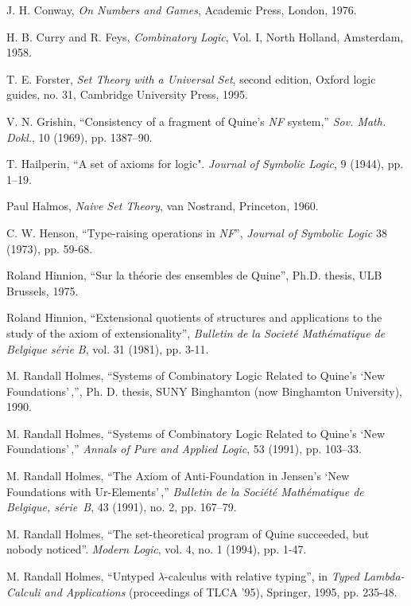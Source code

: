 \begin{thebibliography}{99}

  J. H. Conway, {\em On Numbers and Games\/}, Academic
Press, London, 1976.

  H. B. Curry and R. Feys, {\em Combinatory Logic}, Vol.
I, North Holland, Amsterdam, 1958.

T. E. Forster, {\em Set Theory with a Universal
Set\/}, second edition, Oxford logic guides, no. 31, Cambridge
University Press, 1995.

  V. N. Grishin, ``Consistency of a fragment of
Quine's {\em NF} system,'' {\em Sov. Math. Dokl.}, 10 (1969), pp. 1387--90.

 T. Hailperin, ``A set of axioms for logic".  {\em
Journal of Symbolic Logic\/}, 9 (1944), pp. 1--19.

 Paul Halmos, {\em Naive Set Theory\/}, van Nostrand,
Princeton, 1960.

 C. W. Henson,
``Type-raising operations in {\em NF\/}'',
{\em Journal of Symbolic Logic\/} 38 (1973), pp. 59-68.

  Roland Hinnion,
``Sur la th\'eorie des ensembles de Quine'',
Ph.D. thesis, ULB Brussels, 1975.

  Roland Hinnion, ``Extensional quotients of structures and applications to the study of the axiom of extensionality'', {\em Bulletin de la Societ\'e Math\'ematique de Belgique s\'erie B\/}, vol. 31 (1981), pp. 3-11.

 M. Randall Holmes, ``Systems of Combinatory Logic
Related to Quine's `New Foundations'\,,'', Ph. D. thesis, SUNY
Binghamton (now Binghamton University), 1990.

  M. Randall Holmes, ``Systems of Combinatory Logic Related to
Quine's `New Foundations'\,,'' {\em Annals of Pure and Applied Logic},
53 (1991), pp. 103--33.

 M. Randall Holmes, ``The Axiom of Anti-Foundation in
Jensen's `New Foundations with Ur-Elements'\,,'' {\em Bulletin de la
Soci\'et\'e Math\'ematique de Belgique, s\'erie~B}, 43 (1991), no. 2,
pp. 167--79.

 M. Randall Holmes, ``The set-theoretical program of
Quine succeeded, but nobody noticed''. {\em Modern Logic\/}, vol. 4,
no. 1 (1994), pp. 1-47.

 M. Randall Holmes, ``Untyped $\lambda
$-calculus with relative typing'', in {\em Typed Lambda-Calculi and
Applications\/} (proceedings of TLCA '95), Springer, 1995, pp. 235-48.


\end{thebibliography}
